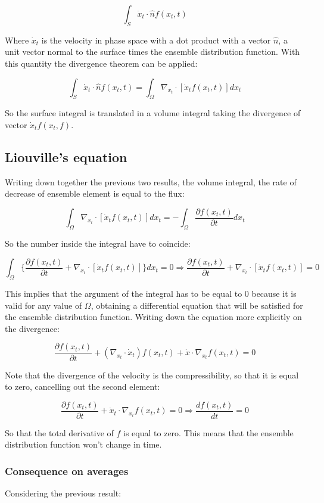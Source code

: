 	$$\int_S\dot{x}_t\cdot\hat{n} f(x_t,t)$$

	Where $\dot{x}_t$ is the velocity in phase space with a dot product with a vector $\hat{n}$, a unit vector normal to the surface times the ensemble distribution function.
	With this quantity the divergence theorem can be applied:

	$$\int_S\dot{x}_t\cdot\hat{n}f(x_t,t) = \int_\Omega\nabla_{x_t}\cdot[\dot{x}_tf(x_t,t)]dx_t$$

	So the surface integral is translated in a volume integral taking the divergence of vector $\dot{x}_t f(x_t, f)$.

	\subsection{Liouville's equation}
	Writing down together the previous two results, the volume integral, the rate of decrease of ensemble element is equal to the flux:

	$$\int_\Omega\nabla_{x_t}\cdot[\dot{x}_tf(x_t, t)]dx_t = -\int_\Omega\frac{\partial f(x_t, t)}{\partial t}dx_t$$

	So the number inside the integral have to coincide:

	$$\int_\Omega\biggl\{\frac{\partial f(x_t, t)}{\partial t} + \nabla_{x_t}\cdot[\dot{x}_tf(x_t, t)]\biggr\}dx_t = 0\Rightarrow \frac{\partial f(x_t, t)}{\partial t} + \nabla_{x_t}\cdot[\dot{x}_tf(x_t, t)] = 0$$

	This implies that the argument of the integral has to be equal to $0$ because it is valid for any value of $\Omega$, obtaining a differential equation that will be satisfied for the ensemble distribution function.
	Writing down the equation more explicitly on the divergence:

	$$\frac{\partial f(x_t, t)}{\partial t} + (\nabla_{x_t}\cdot\dot{x}_t)f(x_t, t) + \dot{x}\cdot\nabla_{x_t}f(x_t, t) = 0$$

	Note that the divergence of the velocity is the compressibility, so that it is equal to zero, cancelling out the second element:

	$$\frac{\partial f(x_t, t)}{\partial t} + \dot{x}_t\cdot\nabla_{x_t}f(x_t, t) = 0\Rightarrow \frac{df(x_t, t)}{dt} = 0$$

	So that the total derivative of $f$ is equal to zero.
	This means that the ensemble distribution function won't change in time.

		\subsubsection{Consequence on averages}
		Considering the previous result:

